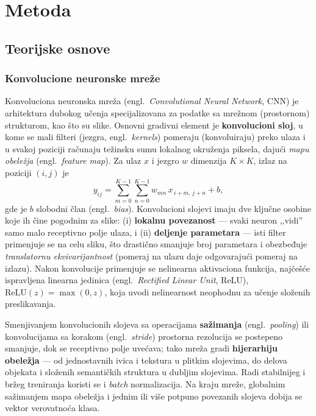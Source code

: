 \documentclass[12pt,a4paper]{article}
\begin{document}
\section{Metoda}
\label{sec:metoda}

\subsection{Teorijske osnove}
\label{sec:teorija}

\subsubsection{Konvolucione neuronske mreže}
\label{sec:cnn}

Konvoluciona neuronska mreža (engl.\ \textit{Convolutional Neural Network}, CNN) je
arhitektura dubokog učenja specijalizovana za podatke sa mrežnom (prostornom) strukturom,
kao što su slike. Osnovni gradivni element je \textbf{konvolucioni sloj}, u kome se mali
filteri (jezgra, engl.\ \textit{kernels}) pomeraju (konvoluiraju) preko ulaza i u svakoj
poziciji računaju težinsku sumu lokalnog okruženja piksela, dajući \textit{mapu obeležja}
(engl.\ \textit{feature map}). Za ulaz $x$ i jezgro $w$ dimenzija $K\times K$, izlaz na
poziciji $(i,j)$ je
\begin{equation}
y_{ij} = \sum_{m=0}^{K-1}\sum_{n=0}^{K-1} w_{mn}\, x_{\,i+m,\,j+n} + b,
\label{eq:konv}
\end{equation}
gde je $b$ slobodni član (engl.\ \textit{bias}). Konvolucioni slojevi imaju dve ključne
osobine koje ih čine pogodnim za slike: (i) \textbf{lokalnu povezanost} --- svaki neuron
,,vidi'' samo malo receptivno polje ulaza, i (ii) \textbf{deljenje parametara} --- isti
filter primenjuje se na celu sliku, što drastično smanjuje broj parametara i obezbeđuje
\textit{translatornu ekvivarijantnost} (pomeraj na ulazu daje odgovarajući pomeraj na
izlazu). Nakon konvolucije primenjuje se nelinearna aktivaciona funkcija, najčešće
ispravljena linearna jedinica (engl.\ \textit{Rectified Linear Unit}, ReLU),
$\mathrm{ReLU}(z)=\max(0,z)$, koja uvodi nelinearnost neophodnu za učenje složenih
preslikavanja.

Smenjivanjem konvolucionih slojeva sa operacijama \textbf{sažimanja} (engl.\
\textit{pooling}) ili konvolucijama sa korakom (engl.\ \textit{stride}) prostorna
rezolucija se postepeno smanjuje, dok se receptivno polje uvećava; tako mreža gradi
\textbf{hijerarhiju obeležja} --- od jednostavnih ivica i tekstura u plitkim slojevima, do
delova objekata i složenih semantičkih struktura u dubljim slojevima. Radi stabilnijeg i
bržeg treniranja koristi se i \textit{batch} normalizacija. Na kraju mreže, globalnim
sažimanjem mapa obeležja i jednim ili više potpuno povezanih slojeva dobija se vektor
verovatnoća klasa.
\end{document}
